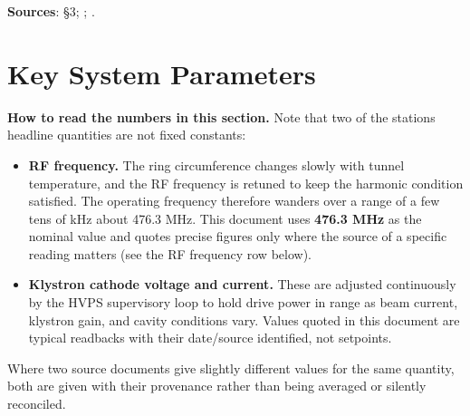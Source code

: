 


\begin{keynote}
\textbf{Sources}:  §3; ; .
\end{keynote}



\section{Key System Parameters}

\begin{keynote}
\textbf{How to read the numbers in this section.} Note that two of the station\textquotesingle s headline quantities are not fixed constants:

\begin{itemize}
\tightlist
\item
  \textbf{RF frequency.} The ring circumference changes slowly with tunnel temperature, and the RF frequency is retuned to keep the harmonic condition satisfied. The operating frequency therefore wanders over a range of a few tens of kHz about 476.3 MHz. This document uses \textbf{476.3 MHz} as the nominal value and quotes precise figures only where the source of a specific reading matters (see the RF frequency row below).
\item
  \textbf{Klystron cathode voltage and current.} These are adjusted continuously by the HVPS supervisory loop to hold drive power in range as beam current, klystron gain, and cavity conditions vary. Values quoted in this document are typical readbacks with their date/source identified, not setpoints.
\end{itemize}

Where two source documents give slightly different values for the same quantity, both are given with their provenance rather than being averaged or silently reconciled.
\end{keynote}

